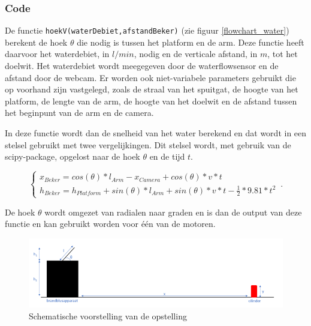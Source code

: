 \documentclass[kulak]{kulakarticle} %
\begin{document}
		\subsubsection{Code}
		
			De functie \verb*|hoekV(waterDebiet,afstandBeker)| (zie figuur \ref{flowchart_water}) berekent de hoek \(\theta\)  die nodig is tussen het platform en de arm. Deze functie heeft daarvoor het waterdebiet, in \(l/min\), nodig en de verticale afstand, in \(m\), tot het doelwit. Het waterdebiet wordt meegegeven door de waterflowsensor en de afstand door de webcam. Er worden ook niet-variabele parameters gebruikt die op voorhand zijn vastgelegd, zoals de straal van het spuitgat, de hoogte van het platform, de lengte van de arm, de hoogte van het doelwit en de afstand tussen het beginpunt van de arm en de camera. 

			In deze functie wordt dan de snelheid van het water berekend en dat wordt in een stelsel gebruikt met twee vergelijkingen. Dit stelsel wordt, met gebruik van de scipy-package, opgelost naar de hoek \(\theta\) en de tijd \(t\).
			
				\begin{equation}
					\begin{cases}
						x_{Beker}  = cos(\theta )*l_{Arm} - x_{Camera} + cos(\theta )*v*t \\ 
						h_{Beker}  =  h_{Platform} + sin(\theta )*l_{Arm} + sin(\theta )*v*t - \frac{1}{2}*9.81*t^2
					\end{cases}\,.
				\end{equation}
				
			De hoek \(\theta\) wordt omgezet van radialen naar graden en is dan de output van deze functie en kan gebruikt worden voor één van de motoren.

				\begin{figure} [h!]
					\centering
					\includegraphics[width = 1 \textwidth]{schematische voorstelling water LATEX}
					\caption{Schematische voorstelling van de opstelling}
					\label{schematische voorstelling}
				\end{figure}
\end{document}
